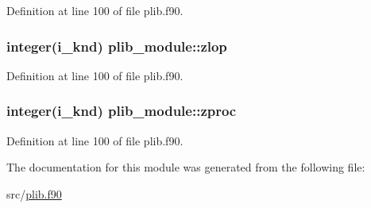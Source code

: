 Definition at line 100 of file plib.\-f90.

\hypertarget{classplib__module_a3a7c2d7b52bbd28281bd1affd1d50bf1}{
\subsubsection[{zlop}]{\setlength{\rightskip}{0pt plus 5cm}integer(i\-\_\-knd) plib\-\_\-module\-::zlop}}\label{classplib__module_a3a7c2d7b52bbd28281bd1affd1d50bf1}


Definition at line 100 of file plib.\-f90.

\hypertarget{classplib__module_abce2abcf8d84587f2d4a066fa1287d81}{
\subsubsection[{zproc}]{\setlength{\rightskip}{0pt plus 5cm}integer(i\-\_\-knd) plib\-\_\-module\-::zproc}}\label{classplib__module_abce2abcf8d84587f2d4a066fa1287d81}


Definition at line 100 of file plib.\-f90.



The documentation for this module was generated from the following file\-:\begin{DoxyCompactItemize}
\item 
src/\hyperlink{plib_8f90}{plib.\-f90}\end{DoxyCompactItemize}
